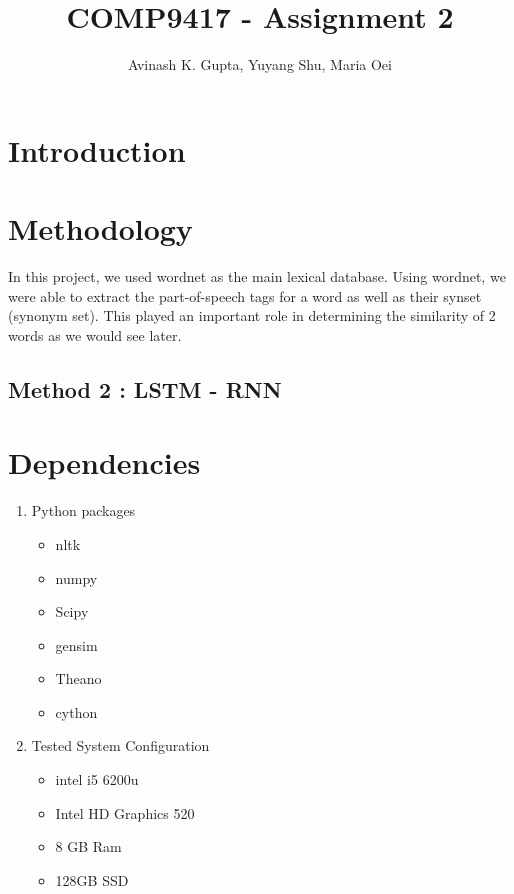 \documentclass[11pt, oneside]{article}   	%
\title{COMP9417 - Assignment 2}
\author{Avinash K. Gupta, Yuyang Shu, Maria Oei}
\begin{document}
\maketitle
\newpage
\tableofcontents
\newpage
\section{Introduction}



\section{Methodology}
In this project, we used wordnet as the main lexical database. Using wordnet, we were able to extract the part-of-speech tags for a word as well as their synset (synonym set). This played an important role in determining the similarity of 2 words as we would see later.





\subsection{Method 2 : LSTM - RNN}
%



\section{Dependencies}

\begin{enumerate}
\item   Python packages

\begin{itemize}
\item nltk
\item numpy
\item Scipy
\item gensim
\item Theano
\item cython
\end{itemize}
\item Tested System Configuration
\begin{itemize}

\item intel i5 6200u
\item Intel HD Graphics 520
\item 8 GB Ram
\item 128GB SSD

\end{itemize}

\end{enumerate}
\end{document}
